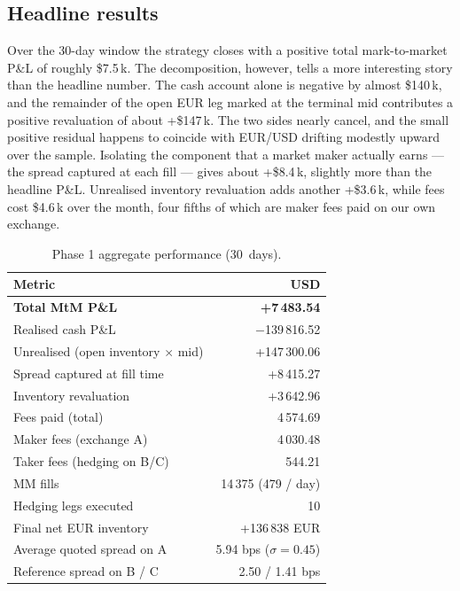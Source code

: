 \subsection{Headline results}

Over the 30-day window the strategy closes with a positive total mark-to-market P\&L of roughly \$7.5\,k. The decomposition, however, tells a more interesting story than the headline number. The cash account alone is negative by almost \$140\,k, and the remainder of the open EUR leg marked at the terminal mid contributes a positive revaluation of about +\$147\,k. The two sides nearly cancel, and the small positive residual happens to coincide with EUR/USD drifting modestly upward over the sample. Isolating the component that a market maker actually earns --- the spread captured at each fill --- gives about +\$8.4\,k, slightly more than the headline P\&L. Unrealised inventory revaluation adds another +\$3.6\,k, while fees cost \$4.6\,k over the month, four fifths of which are maker fees paid on our own exchange.

\begin{table}[ht]
\centering
\small
\begin{tabular}{lr}
\toprule
Metric & USD \\
\midrule
\textbf{Total MtM P\&L} & \textbf{+7\,483.54} \\
\quad Realised cash P\&L & $-$139\,816.52 \\
\quad Unrealised (open inventory $\times$ mid) & +147\,300.06 \\
\midrule
Spread captured at fill time & +8\,415.27 \\
Inventory revaluation & +3\,642.96 \\
Fees paid (total) & 4\,574.69 \\
\quad Maker fees (exchange A) & 4\,030.48 \\
\quad Taker fees (hedging on B/C) & 544.21 \\
\midrule
MM fills & 14\,375 (479 / day) \\
Hedging legs executed & 10 \\
Final net EUR inventory & +136\,838 EUR \\
Average quoted spread on A & 5.94 bps ($\sigma = 0.45$) \\
Reference spread on B / C & 2.50 / 1.41 bps \\
\bottomrule
\end{tabular}
\caption{Phase 1 aggregate performance (30~days).}
\label{tab:p1-kpi}
\end{table}

